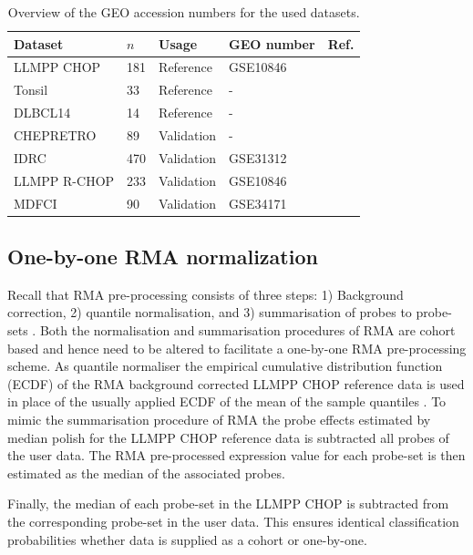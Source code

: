 \documentclass{article}
\begin{document}
\begin{table}%
\small
\caption{Overview of the GEO accession numbers for the used datasets.}
\label{table:01}%
\begin{center}
\begin{tabular}{lllll}
\hline\hline
Dataset & $n$ & Usage & GEO number & Ref.
\\
\hline
LLMPP CHOP & 181 & Reference & GSE10846 & \citep{Lenz2008a}
\\
Tonsil & 33 & Reference & - & \citep{Dybkaer2013}
\\
DLBCL14 & 14 & Reference & - & \citep{Falgreen2013c}
\\
CHEPRETRO & 89 & Validation & - & \citep{Dybkaer2013}
\\
IDRC & 470 & Validation & GSE31312 & \citep{Visco2012}
\\
LLMPP R-CHOP & 233 & Validation & GSE10846 & \citep{Lenz2008a}
\\
MDFCI & 90 & Validation & GSE34171 & \citep{Monti2012a}\\
\hline
\end{tabular}
\end{center}
\end{table}

\subsection{One-by-one RMA normalization}
Recall that RMA pre-processing consists of three steps: 1) Background correction, 2) quantile normalisation, and 3) summarisation of probes to probe-sets \citep{Irizarry2003}.
Both the normalisation and summarisation procedures of RMA are cohort based and hence need to be altered to facilitate a one-by-one RMA pre-processing scheme.
As quantile normaliser the empirical cumulative distribution function (ECDF) of the RMA background corrected LLMPP CHOP reference data is used in place of the usually applied ECDF of the mean of the sample quantiles \citep{Bolstad2003}.
To mimic the summarisation procedure of RMA \citep{Irizarry2003b} the probe effects estimated by median polish for the LLMPP CHOP reference data is subtracted all probes of the user data.
The RMA pre-processed expression value for each probe-set is then estimated as the median of the associated probes.

Finally, the median of each probe-set in the LLMPP CHOP is subtracted from the corresponding probe-set in the user data.
This ensures identical classification probabilities whether data is supplied as a cohort or one-by-one.
\end{document}
